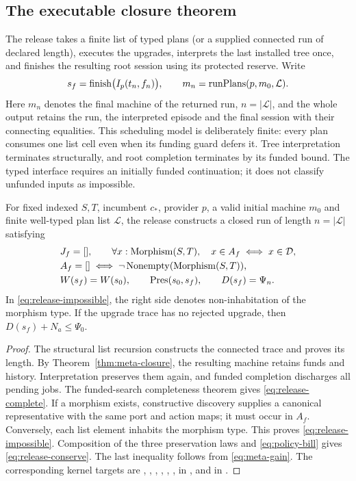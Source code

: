 \subsection{The executable closure theorem}
The release takes a finite list of typed plans (or a supplied connected run of declared length), executes the upgrades, interprets the last installed tree once, and finishes the resulting root session using its protected reserve. Write
\begin{equation}\label{eq:release-pipeline}
 s_f=\operatorname{finish}\bigl(I_p(t_n,f_n)\bigr),\qquad
 m_n=\operatorname{runPlans}(p,m_0,\mathcal L).
\end{equation}
Here $m_n$ denotes the final machine of the returned run, $n=|\mathcal L|$, and the whole output retains the run, the interpreted episode and the final session with their connecting equalities. This scheduling model is deliberately finite: every plan consumes one list cell even when its funding guard defers it. Tree interpretation terminates structurally, and root completion terminates by its funded bound. The typed interface requires an initially funded continuation; it does not classify unfunded inputs as impossible.

\begin{theorem}\label{thm:release}
For fixed indexed $S,T$, incumbent $c_*$, provider $p$, a valid initial machine $m_0$ and finite well-typed plan list $\mathcal L$, the release constructs a closed run of length $n=|\mathcal L|$ satisfying
\begin{align}
 &J_f=[] ,\qquad \forall x:\mathrm{Morphism}(S,T),\quad x\in A_f\iff x\in\mathcal D,\label{eq:release-complete}\\
 &A_f=[]\iff \neg\operatorname{Nonempty}(\mathrm{Morphism}(S,T)),\label{eq:release-impossible}\\
 &W(s_f)=W(s_0),\qquad \operatorname{Pres}(s_0,s_f),\qquad D(s_f)=\Psi_n.\label{eq:release-conserve}
\end{align}
In \eqref{eq:release-impossible}, the right side denotes non-inhabitation of the morphism type. If the upgrade trace has no rejected upgrade, then $D(s_f)+N_a\le\Psi_0$.
\end{theorem}
\begin{proof}
The structural list recursion constructs the connected trace and proves its length. By Theorem~\ref{thm:meta-closure}, the resulting machine retains funds and history. Interpretation preserves them again, and funded completion discharges all pending jobs. The funded-search completeness theorem gives \eqref{eq:release-complete}. If a morphism exists, constructive discovery supplies a canonical representative with the same port and action maps; it must occur in $A_f$. Conversely, each list element inhabits the morphism type. This proves \eqref{eq:release-impossible}. Composition of the three preservation laws and \eqref{eq:policy-bill} gives \eqref{eq:release-conserve}. The last inequality follows from \eqref{eq:meta-gain}. The corresponding kernel targets are , , , , , ,  in , and  in .
\end{proof}

